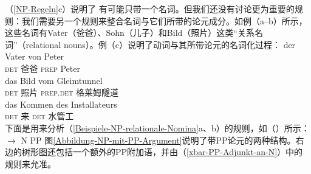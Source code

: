 （\ref{NP-Regeln}c）说明了 \nbarc 有可能只带一个名词。但我们还没有讨论更为重要的规则：我们需要另一个规则来整合名词与它们所带的论元成分。如例（a--b）所示，这些名词有Vater（爸爸）、Sohn（儿子）和Bild（照片）这类“关系名词”（relational nouns）。例（c）说明了动词与其所带论元的名词化过程：
\eal
\label{Beispiele-NP-relationale-Nomina}
\ex 
\gll der Vater von Peter\\
	 \textsc{det} 爸爸 \textsc{prep} Peter\\
\ex 
\gll das Bild vom Gleimtunnel\\
	 \textsc{det} 照片 \textsc{prep}.\textsc{det} 格莱姆隧道\\
\ex 
\gll das Kommen des Installateurs\\
	 \textsc{det} 来 \textsc{det} 水管工\\
\zl
\noindent
下面是用来分析（\ref{Beispiele-NP-relationale-Nomina}a、b）的规则，如（）所示：
\ea
\nbar $\to$ N PP
\z
%
图\ref{Abbildung-NP-mit-PP-Argument}说明了带PP论元的两种结构。右边的树形图还包括一个额外的PP附加语，并由（\ref{xbar-PP-Adjunkt-an-N}）中的规则来允准。
